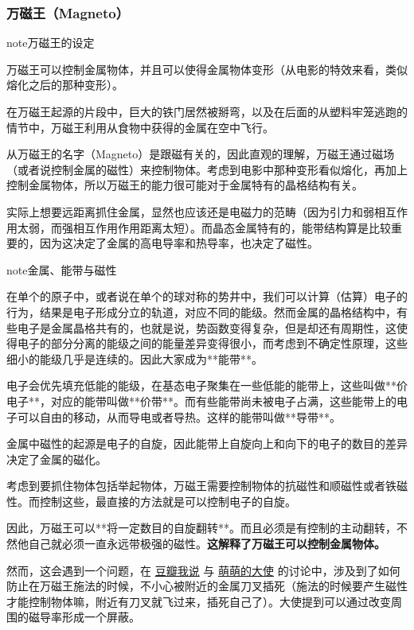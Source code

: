 \documentclass[letterpaper,10pt,english]{sphinxmanual}
\begin{document}
\subsubsection{万磁王（Magneto）}
\label{superpower:magneto}
\begin{notice}{note}{万磁王的设定}

万磁王可以控制金属物体，并且可以使得金属物体变形（从电影的特效来看，类似熔化之后的那种变形）。

在万磁王起源的片段中，巨大的铁门居然被掰弯，以及在后面的从塑料牢笼逃跑的情节中，万磁王利用从食物中获得的金属在空中飞行。
\end{notice}

从万磁王的名字（Magneto）是跟磁有关的，因此直观的理解，万磁王通过磁场（或者说控制金属的磁性）来控制物体。考虑到电影中那种变形看似熔化，再加上控制金属物体，所以万磁王的能力很可能对于金属特有的晶格结构有关。

实际上想要远距离抓住金属，显然也应该还是电磁力的范畴（因为引力和弱相互作用太弱，而强相互作用作用距离太短）。而晶态金属特有的，能带结构算是比较重要的，因为这决定了金属的高电导率和热导率，也决定了磁性。

\begin{notice}{note}{金属、能带与磁性}

在单个的原子中，或者说在单个的球对称的势井中，我们可以计算（估算）电子的行为，结果是电子形成分立的轨道，对应不同的能级。然而金属的晶格结构中，有些电子是金属晶格共有的，也就是说，势函数变得复杂，但是却还有周期性，这使得电子的部分分离的能级之间的能量差异变得很小，而考虑到不确定性原理，这些细小的能级几乎是连续的。因此大家成为**能带**。

电子会优先填充低能的能级，在基态电子聚集在一些低能的能带上，这些叫做**价电子**，对应的能带叫做**价带**。而有些能带尚未被电子占满，这些能带上的电子可以自由的移动，从而导电或者导热。这样的能带叫做**导带**。

金属中磁性的起源是电子的自旋，因此能带上自旋向上和向下的电子的数目的差异决定了金属的磁化。
\end{notice}

考虑到要抓住物体包括举起物体，万磁王需要控制物体的抗磁性和顺磁性或者铁磁性。而控制这些，最直接的方法就是可以控制电子的自旋。

因此，万磁王可以**将一定数目的自旋翻转**。而且必须是有控制的主动翻转，不然他自己就必须一直永远带极强的磁性。\textbf{这解释了万磁王可以控制金属物体。}

然而，这会遇到一个问题，在 \href{http://www.douban.com/people/emptymalei/status/1535791054/}{豆瓣我说} 与 \href{http://www.douban.com/people/Raman/}{萌萌的大使} 的讨论中，涉及到了如何防止在万磁王施法的时候，不小心被附近的金属刀叉插死（施法的时候要产生磁性才能控制物体嘛，附近有刀叉就飞过来，插死自己了）。大使提到可以通过改变周围的磁导率形成一个屏蔽。
\end{document}
